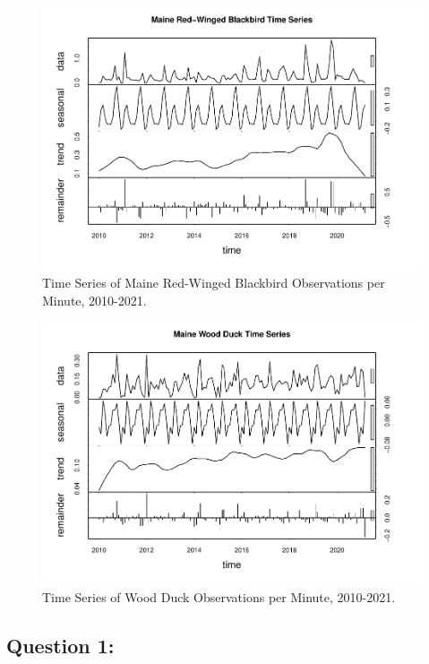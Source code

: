 \documentclass[
  12pt,
]{article}
\begin{document}
\begin{figure}
\centering
\includegraphics{Project_report_ME_files/figure-latex/Time.SeriesR-1.pdf}
\caption{Time Series of Maine Red-Winged Blackbird Observations per
Minute, 2010-2021.}
\end{figure}

\begin{figure}
\centering
\includegraphics{Project_report_ME_files/figure-latex/Time.SeriesW-1.pdf}
\caption{Time Series of Wood Duck Observations per Minute, 2010-2021.}
\end{figure}

\hypertarget{question-1}{%
\subsection{Question 1:}\label{question-1}}
\end{document}
